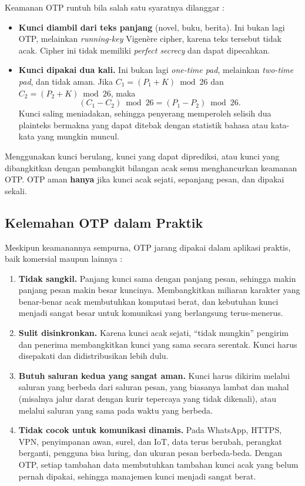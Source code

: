 Keamanan OTP runtuh bila salah satu syaratnya dilanggar \cite{munir_slides_itb}:
\begin{itemize}
  \item \textbf{Kunci diambil dari teks panjang} (novel, buku, berita). Ini bukan lagi OTP, melainkan \textit{running-key} Vigen\`{e}re cipher, karena teks tersebut tidak acak. Cipher ini tidak memiliki \textit{perfect secrecy} dan dapat dipecahkan.
  \item \textbf{Kunci dipakai dua kali.} Ini bukan lagi \textit{one-time pad}, melainkan \textit{two-time pad}, dan tidak aman. Jika $C_1 = (P_1 + K) \bmod 26$ dan $C_2 = (P_2 + K) \bmod 26$, maka
  \[
  (C_1 - C_2) \bmod 26 = (P_1 - P_2) \bmod 26.
  \]
  Kunci saling meniadakan, sehingga penyerang memperoleh selisih dua plainteks bermakna yang dapat ditebak dengan statistik bahasa atau kata-kata yang mungkin muncul.
\end{itemize}

\begin{catatan}
Menggunakan kunci berulang, kunci yang dapat diprediksi, atau kunci yang dibangkitkan dengan pembangkit bilangan acak semu menghancurkan keamanan OTP. OTP aman \textbf{hanya} jika kunci acak sejati, sepanjang pesan, dan dipakai sekali.
\end{catatan}

\subsection{Kelemahan OTP dalam Praktik}

Meskipun keamanannya sempurna, OTP jarang dipakai dalam aplikasi praktis, baik komersial maupun lainnya \cite{munir_slides_itb}:
\begin{enumerate}
  \item \textbf{Tidak sangkil.} Panjang kunci sama dengan panjang pesan, sehingga makin panjang pesan makin besar kuncinya. Membangkitkan miliaran karakter yang benar-benar acak membutuhkan komputasi berat, dan kebutuhan kunci menjadi sangat besar untuk komunikasi yang berlangsung terus-menerus.
  \item \textbf{Sulit disinkronkan.} Karena kunci acak sejati, ``tidak mungkin'' pengirim dan penerima membangkitkan kunci yang sama secara serentak. Kunci harus disepakati dan didistribusikan lebih dulu.
  \item \textbf{Butuh saluran kedua yang sangat aman.} Kunci harus dikirim melalui saluran yang berbeda dari saluran pesan, yang biasanya lambat dan mahal (misalnya jalur darat dengan kurir tepercaya yang tidak dikenali), atau melalui saluran yang sama pada waktu yang berbeda.
  \item \textbf{Tidak cocok untuk komunikasi dinamis.} Pada WhatsApp, HTTPS, VPN, penyimpanan awan, surel, dan IoT, data terus berubah, perangkat berganti, pengguna bisa luring, dan ukuran pesan berbeda-beda. Dengan OTP, setiap tambahan data membutuhkan tambahan kunci acak yang belum pernah dipakai, sehingga manajemen kunci menjadi sangat berat.
\end{enumerate}

